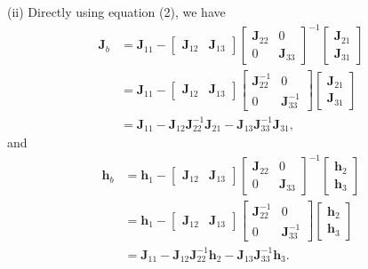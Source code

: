 \documentclass{article}
\newcommand{\qeds}{\hfill\qedsymbol}
\newcommand{\bm}{\mathbf}
\begin{document}
\noindent
(ii) Directly using equation (2), we have
\begin{align*}
	\bm{J}_b &= \bm{J}_{11} -
\begin{bmatrix}
    \bm{J}_{12} & \bm{J}_{13} 
\end{bmatrix}
\begin{bmatrix}
    \bm{J}_{22} & 0 \\
    0 & \bm{J}_{33}
\end{bmatrix}^{-1}
\begin{bmatrix}
    \bm{J}_{21} \\
    \bm{J}_{31}
\end{bmatrix} \\
&= \bm{J}_{11} -
\begin{bmatrix}
    \bm{J}_{12} & \bm{J}_{13} 
\end{bmatrix}
\begin{bmatrix}
    \bm{J}_{22}^{-1} & 0 \\
    0 & \bm{J}_{33}^{-1}
\end{bmatrix}
\begin{bmatrix}
    \bm{J}_{21} \\
    \bm{J}_{31}
\end{bmatrix}\\
&= \bm{J}_{11} - \bm{J}_{12}\bm{J}_{22}^{-1}\bm{J}_{21} - \bm{J}_{13}\bm{J}_{33}^{-1}\bm{J}_{31},
\end{align*}
and
\begin{align*}
	\bm{h}_b &= \bm{h}_1 - 
\begin{bmatrix}
    \bm{J}_{12} & \bm{J}_{13} 
\end{bmatrix}
\begin{bmatrix}
    \bm{J}_{22} & 0 \\
    0 & \bm{J}_{33}
\end{bmatrix}^{-1}
\begin{bmatrix}
    \bm{h}_{2} \\
    \bm{h}_{3}
\end{bmatrix} \\
&= \bm{h}_1 - 
\begin{bmatrix}
    \bm{J}_{12} & \bm{J}_{13} 
\end{bmatrix}
\begin{bmatrix}
    \bm{J}_{22}^{-1} & 0 \\
    0 & \bm{J}_{33}^{-1}
\end{bmatrix}
\begin{bmatrix}
    \bm{h}_{2} \\
    \bm{h}_{3}
\end{bmatrix} \\
&=\bm{J}_{11} - \bm{J}_{12}\bm{J}_{22}^{-1}\bm{h}_{2} - \bm{J}_{13}\bm{J}_{33}^{-1}\bm{h}_{3}.
\end{align*}\qeds
\pagebreak
\end{document}
